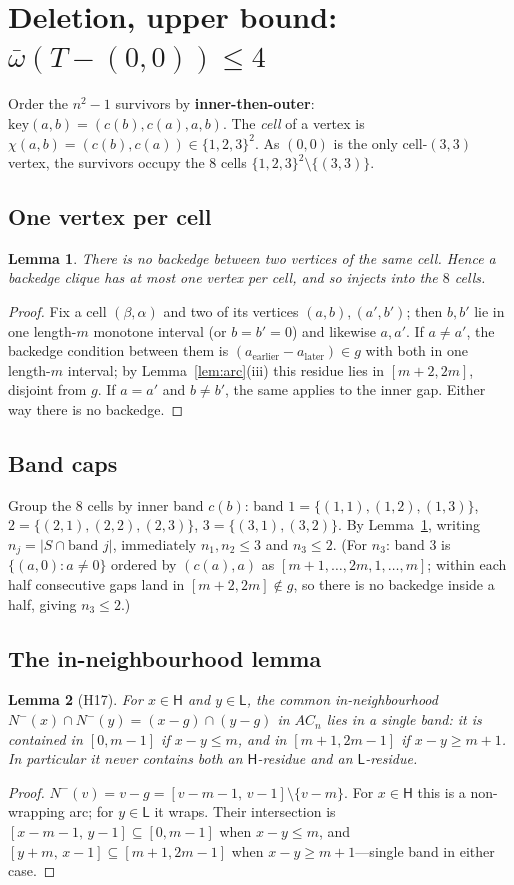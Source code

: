 \documentclass[11pt]{article}
\newcommand{\ob}{\bar\omega}
\newcommand{\Hi}{\mathsf{H}}
\newcommand{\Lo}{\mathsf{L}}
\newcommand{\Ninv}{N^{-}}
\theoremstyle{plain}
\newtheorem{lemma}{Lemma}
\theoremstyle{definition}
\begin{document}
\section{Deletion, upper bound: $\ob(T-(0,0))\le 4$}
Order the $n^2-1$ survivors by \textbf{inner-then-outer}: $\mathrm{key}(a,b)=(c(b),c(a),a,b)$.
The \emph{cell} of a vertex is $\chi(a,b)=(c(b),c(a))\in\{1,2,3\}^2$. As $(0,0)$ is the only
cell-$(3,3)$ vertex, the survivors occupy the $8$ cells $\{1,2,3\}^2\setminus\{(3,3)\}$.

\subsection{One vertex per cell}\label{ss:cell}
\begin{lemma}\label{lem:cell}
There is no backedge between two vertices of the same cell. Hence a backedge clique has at most
one vertex per cell, and so injects into the $8$ cells.
\end{lemma}
\begin{proof}
Fix a cell $(\beta,\alpha)$ and two of its vertices $(a,b),(a',b')$; then $b,b'$ lie in one
length-$m$ monotone interval (or $b=b'=0$) and likewise $a,a'$. If $a\ne a'$, the backedge
condition between them is $(a_{\text{earlier}}-a_{\text{later}})\in g$ with both in one
length-$m$ interval; by Lemma~\ref{lem:arc}(iii) this residue lies in $[m+2,2m]$, disjoint from
$g$. If $a=a'$ and $b\ne b'$, the same applies to the inner gap. Either way there is no backedge.
\end{proof}

\subsection{Band caps}
Group the $8$ cells by inner band $c(b)$: band $1=\{(1,1),(1,2),(1,3)\}$,
$2=\{(2,1),(2,2),(2,3)\}$, $3=\{(3,1),(3,2)\}$. By Lemma~\ref{lem:cell}, writing
$n_j=|S\cap\text{band }j|$, immediately $n_1,n_2\le3$ and $n_3\le2$. (For $n_3$: band $3$ is
$\{(a,0):a\ne0\}$ ordered by $(c(a),a)$ as $[m+1,\dots,2m,1,\dots,m]$; within each half
consecutive gaps land in $[m+2,2m]\notin g$, so there is no backedge inside a half, giving
$n_3\le2$.)

\subsection{The in-neighbourhood lemma}
\begin{lemma}[H17]\label{lem:h17}
For $x\in\Hi$ and $y\in\Lo$, the common in-neighbourhood $\Ninv(x)\cap\Ninv(y)=(x-g)\cap(y-g)$
in $AC_n$ lies in a single band: it is contained in $[0,m-1]$ if $x-y\le m$, and in $[m+1,2m-1]$
if $x-y\ge m+1$. In particular it never contains both an $\Hi$-residue and an $\Lo$-residue.
\end{lemma}
\begin{proof}
$\Ninv(v)=v-g=[v-m-1,\,v-1]\setminus\{v-m\}$. For $x\in\Hi$ this is a non-wrapping arc; for
$y\in\Lo$ it wraps. Their intersection is $[x-m-1,\,y-1]\subseteq[0,m-1]$ when $x-y\le m$, and
$[y+m,\,x-1]\subseteq[m+1,2m-1]$ when $x-y\ge m+1$---single band in either case.
\end{proof}
\end{document}
